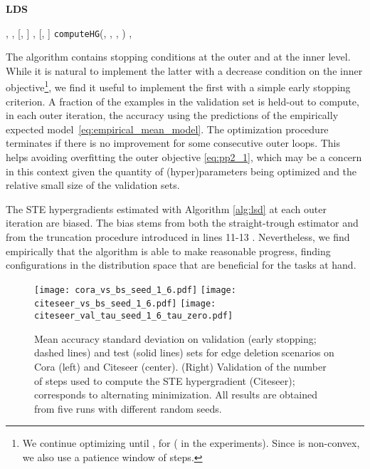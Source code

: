 \documentclass{article}
\newcommand{\lds}{\textsc{LDS}\xspace}
\begin{document}
\begin{algorithm}[t]
\small
	\caption{\textbf{\lds}}
	\label{alg:lsd}
	\begin{algorithmic}[1]
		 , , [, ] 
		 , [, ] 
\STATE  \hfill {}
		\STATE   \hfill {} 
\STATE 
			\STATE 
\hfill {} 
			\STATE   \hfill {}
			\STATE 
				\STATE  \texttt{computeHG}(, , ,  ) 
				\STATE  \hfill {}
			\ENDIF
			\ENDWHILE
\ENDWHILE
		 ,  \hfill {}
	\end{algorithmic}
\end{algorithm}


The algorithm contains stopping conditions at the outer and at the inner level. While it is natural to implement the latter with a decrease condition on the inner objective\footnote{We continue optimizing  until , for  ( in the experiments). Since  is non-convex, we also use a patience window of  steps.}, we find it useful to implement the first with a simple early stopping criterion. A fraction of the examples in the validation set is held-out to compute, in each outer iteration, the 
accuracy using the predictions of the empirically expected model~\eqref{eq:empirical_mean_model}. The optimization procedure terminates if there is no improvement for some consecutive outer loops. This helps avoiding overfitting the outer objective \eqref{eq:pp2_1}, which may be a concern in this context given the quantity of (hyper)parameters being optimized and the relative small size of the validation sets.

The STE hypergradients estimated with Algorithm \ref{alg:lsd} 
at each outer iteration are biased. The bias stems from both the straight-trough estimator and from the truncation procedure introduced in lines 11-13 \citep{tallec2017unbiasing}. Nevertheless, we find empirically that the algorithm is able to make reasonable progress, finding configurations in the distribution space that are beneficial for the tasks at hand. 
	


\begin{figure*}[t!]
    \centering
    \texttt{[image: cora\_vs\_bs\_seed\_1\_6.pdf]}
    \texttt{[image: citeseer\_vs\_bs\_seed\_1\_6.pdf]}
    \texttt{[image: citeseer\_val\_tau\_seed\_1\_6\_tau\_zero.pdf]}
    \vspace{-8mm}
    \caption{Mean accuracy  standard deviation on validation (early stopping; dashed lines) and test (solid lines) sets for edge deletion scenarios on Cora (left) and Citeseer (center). 
(Right) Validation of the number of
steps  
used to compute the STE hypergradient (Citeseer);  corresponds to alternating minimization.
    All results are obtained from five runs with different random seeds.}
\label{fig:edgrem}
    \vspace{-4mm}
\end{figure*}
\end{document}
